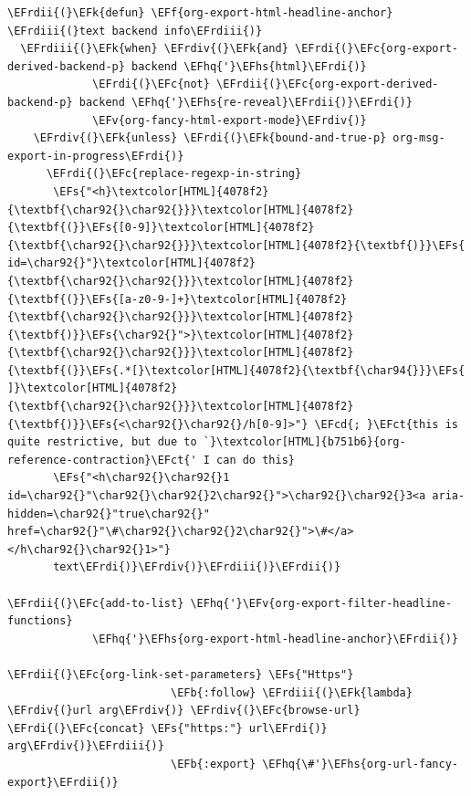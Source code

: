 \documentclass{scrartcl}
\newcommand{\EFk}[1]{\textcolor{EFk}{#1}} %
\newcommand{\EFs}[1]{\textcolor{EFs}{#1}} %
\newcommand{\EFb}[1]{\textcolor{EFb}{#1}} %
\newcommand{\EFct}[1]{\textcolor{EFct}{#1}} %
\newcommand{\EFc}[1]{\textcolor{EFc}{#1}} %
\newcommand{\EFv}[1]{\textcolor{EFv}{#1}} %
\newcommand{\EFf}[1]{\textcolor{EFf}{#1}} %
\newcommand{\EFcd}[1]{\textcolor{EFcd}{#1}} %
\newcommand{\EFhq}[1]{\textcolor{EFhq}{#1}} %
\newcommand{\EFhs}[1]{\textcolor{EFhs}{#1}} %
\newcommand{\EFrdi}[1]{\textcolor{EFrdi}{#1}} %
\newcommand{\EFrdii}[1]{\textcolor{EFrdii}{#1}} %
\newcommand{\EFrdiii}[1]{\textcolor{EFrdiii}{#1}} %
\newcommand{\EFrdiv}[1]{\textcolor{EFrdiv}{#1}} %
\begin{document}
\begin{Code}
\begin{Verbatim}[]
\EFrdii{(}\EFk{defun} \EFf{org-export-html-headline-anchor} \EFrdiii{(}text backend info\EFrdiii{)}
  \EFrdiii{(}\EFk{when} \EFrdiv{(}\EFk{and} \EFrdi{(}\EFc{org-export-derived-backend-p} backend \EFhq{'}\EFhs{html}\EFrdi{)}
             \EFrdi{(}\EFc{not} \EFrdii{(}\EFc{org-export-derived-backend-p} backend \EFhq{'}\EFhs{re-reveal}\EFrdii{)}\EFrdi{)}
             \EFv{org-fancy-html-export-mode}\EFrdiv{)}
    \EFrdiv{(}\EFk{unless} \EFrdi{(}\EFk{bound-and-true-p} org-msg-export-in-progress\EFrdi{)}
      \EFrdi{(}\EFc{replace-regexp-in-string}
       \EFs{"<h}\textcolor[HTML]{4078f2}{\textbf{\char92{}\char92{}}}\textcolor[HTML]{4078f2}{\textbf{(}}\EFs{[0-9]}\textcolor[HTML]{4078f2}{\textbf{\char92{}\char92{}}}\textcolor[HTML]{4078f2}{\textbf{)}}\EFs{ id=\char92{}"}\textcolor[HTML]{4078f2}{\textbf{\char92{}\char92{}}}\textcolor[HTML]{4078f2}{\textbf{(}}\EFs{[a-z0-9-]+}\textcolor[HTML]{4078f2}{\textbf{\char92{}\char92{}}}\textcolor[HTML]{4078f2}{\textbf{)}}\EFs{\char92{}">}\textcolor[HTML]{4078f2}{\textbf{\char92{}\char92{}}}\textcolor[HTML]{4078f2}{\textbf{(}}\EFs{.*[}\textcolor[HTML]{4078f2}{\textbf{\char94{}}}\EFs{ ]}\textcolor[HTML]{4078f2}{\textbf{\char92{}\char92{}}}\textcolor[HTML]{4078f2}{\textbf{)}}\EFs{<\char92{}\char92{}/h[0-9]>"} \EFcd{; }\EFct{this is quite restrictive, but due to `}\textcolor[HTML]{b751b6}{org-reference-contraction}\EFct{' I can do this}
       \EFs{"<h\char92{}\char92{}1 id=\char92{}"\char92{}\char92{}2\char92{}">\char92{}\char92{}3<a aria-hidden=\char92{}"true\char92{}" href=\char92{}"\#\char92{}\char92{}2\char92{}">\#</a> </h\char92{}\char92{}1>"}
       text\EFrdi{)}\EFrdiv{)}\EFrdiii{)}\EFrdii{)}

\EFrdii{(}\EFc{add-to-list} \EFhq{'}\EFv{org-export-filter-headline-functions}
             \EFhq{'}\EFhs{org-export-html-headline-anchor}\EFrdii{)}

\EFrdii{(}\EFc{org-link-set-parameters} \EFs{"Https"}
                         \EFb{:follow} \EFrdiii{(}\EFk{lambda} \EFrdiv{(}url arg\EFrdiv{)} \EFrdiv{(}\EFc{browse-url} \EFrdi{(}\EFc{concat} \EFs{"https:"} url\EFrdi{)} arg\EFrdiv{)}\EFrdiii{)}
                         \EFb{:export} \EFhq{\#'}\EFhs{org-url-fancy-export}\EFrdii{)}


\end{Verbatim}
\end{Code}
\end{document}
